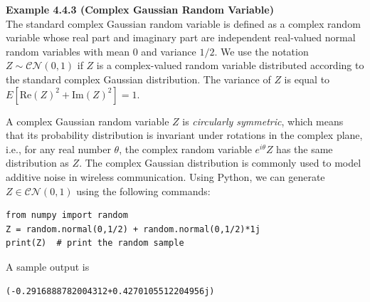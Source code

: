 \textbf{Example 4.4.3 (Complex Gaussian Random Variable)} \\
The standard complex Gaussian random variable is defined as a complex random variable whose real part and imaginary part are independent real-valued normal random variables with mean 0 and variance $1/2$. We use the notation $Z \sim \mathcal{CN}(0, 1)$ if $Z$ is a complex-valued random variable distributed according to the standard complex Gaussian distribution. The variance of $Z$ is equal to $E[\text{Re}(Z)^2 + \text{Im}(Z)^2] = 1$.

A complex Gaussian random variable $Z$ is \textit{circularly symmetric}, which means that its probability distribution is invariant under rotations in the complex plane, i.e., for any real number $\theta$, the complex random variable $e^{i\theta}Z$ has the same distribution as $Z$. The complex Gaussian distribution is commonly used to model additive noise in wireless communication. Using Python, we can generate $Z \in \mathcal{CN}(0, 1)$ using the following commands:

\begin{verbatim}
from numpy import random
Z = random.normal(0,1/2) + random.normal(0,1/2)*1j
print(Z)  # print the random sample
\end{verbatim}

A sample output is
\begin{verbatim}
(-0.2916888782004312+0.4270105512204956j)
\end{verbatim}
